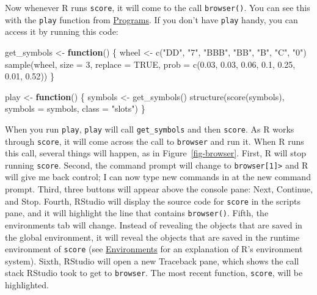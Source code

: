 \documentclass[
  letterpaper,
  DIV=11,
  numbers=noendperiod]{scrbook}
\newenvironment{Shaded}{\begin{snugshade}}{\end{snugshade}}
\newcommand{\AttributeTok}[1]{\textcolor[rgb]{0.40,0.45,0.13}{#1}}
\newcommand{\ConstantTok}[1]{\textcolor[rgb]{0.56,0.35,0.01}{#1}}
\newcommand{\ControlFlowTok}[1]{\textcolor[rgb]{0.00,0.23,0.31}{\textbf{#1}}}
\newcommand{\DecValTok}[1]{\textcolor[rgb]{0.68,0.00,0.00}{#1}}
\newcommand{\FloatTok}[1]{\textcolor[rgb]{0.68,0.00,0.00}{#1}}
\newcommand{\FunctionTok}[1]{\textcolor[rgb]{0.28,0.35,0.67}{#1}}
\newcommand{\NormalTok}[1]{\textcolor[rgb]{0.00,0.23,0.31}{#1}}
\newcommand{\OtherTok}[1]{\textcolor[rgb]{0.00,0.23,0.31}{#1}}
\newcommand{\StringTok}[1]{\textcolor[rgb]{0.13,0.47,0.30}{#1}}
\begin{document}
Now whenever R runs \texttt{score}, it will come to the call
\texttt{browser()}. You can see this with the \texttt{play} function
from \hyperref[sec-programs]{Programs}. If you don't have \texttt{play}
handy, you can access it by running this code:

\begin{Shaded}
\begin{Highlighting}[]
\NormalTok{get\_symbols }\OtherTok{\textless{}{-}} \ControlFlowTok{function}\NormalTok{() \{}
\NormalTok{  wheel }\OtherTok{\textless{}{-}} \FunctionTok{c}\NormalTok{(}\StringTok{"DD"}\NormalTok{, }\StringTok{"7"}\NormalTok{, }\StringTok{"BBB"}\NormalTok{, }\StringTok{"BB"}\NormalTok{, }\StringTok{"B"}\NormalTok{, }\StringTok{"C"}\NormalTok{, }\StringTok{"0"}\NormalTok{)}
  \FunctionTok{sample}\NormalTok{(wheel, }\AttributeTok{size =} \DecValTok{3}\NormalTok{, }\AttributeTok{replace =} \ConstantTok{TRUE}\NormalTok{, }
    \AttributeTok{prob =} \FunctionTok{c}\NormalTok{(}\FloatTok{0.03}\NormalTok{, }\FloatTok{0.03}\NormalTok{, }\FloatTok{0.06}\NormalTok{, }\FloatTok{0.1}\NormalTok{, }\FloatTok{0.25}\NormalTok{, }\FloatTok{0.01}\NormalTok{, }\FloatTok{0.52}\NormalTok{))}
\NormalTok{\}}

\NormalTok{play }\OtherTok{\textless{}{-}} \ControlFlowTok{function}\NormalTok{() \{}
\NormalTok{  symbols }\OtherTok{\textless{}{-}} \FunctionTok{get\_symbols}\NormalTok{()}
  \FunctionTok{structure}\NormalTok{(}\FunctionTok{score}\NormalTok{(symbols), }\AttributeTok{symbols =}\NormalTok{ symbols, }\AttributeTok{class =} \StringTok{"slots"}\NormalTok{)}
\NormalTok{\}}
\end{Highlighting}
\end{Shaded}

When you run \texttt{play}, \texttt{play} will call
\texttt{get\_symbols} and then \texttt{score}. As R works through
\texttt{score}, it will come across the call to \texttt{browser} and run
it. When R runs this call, several things will happen, as in
Figure~\ref{fig-browser}. First, R will stop running \texttt{score}.
Second, the command prompt will change to
\texttt{browser{[}1{]}\textgreater{}} and R will give me back control; I
can now type new commands in at the new command prompt. Third, three
buttons will appear above the console pane: Next, Continue, and Stop.
Fourth, RStudio will display the source code for \texttt{score} in the
scripts pane, and it will highlight the line that contains
\texttt{browser()}. Fifth, the environments tab will change. Instead of
revealing the objects that are saved in the global environment, it will
reveal the objects that are saved in the runtime environment of
\texttt{score} (see \hyperref[sec-environments]{Environments} for an
explanation of R's environment system). Sixth, RStudio will open a new
Traceback pane, which shows the call stack RStudio took to get to
\texttt{browser}. The most recent function, \texttt{score}, will be
highlighted.
\end{document}
